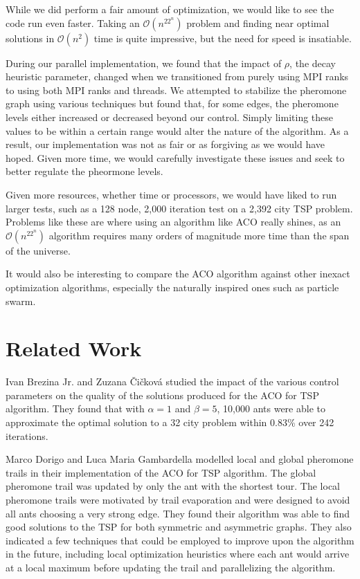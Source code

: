 \documentclass[twocolumn]{article}
\begin{document}
While we did perform a fair amount of optimization, we would like to see the
code run even faster. Taking an $\mathcal{O}(n^22^n)$ problem and finding 
near optimal solutions in $\mathcal{O}(n^2)$ time is quite impressive, but
the need for speed is insatiable.

During our parallel implementation, we found that the impact of $\rho$, the 
decay heuristic parameter, changed when we transitioned from purely using MPI
ranks to using both MPI ranks and threads. We attempted to stabilize the 
pheromone graph using various techniques but found that, for some edges, the
pheromone levels either increased or decreased beyond our control. Simply 
limiting these values to be within a certain range would alter the nature of the
algorithm. As a result, our implementation was not as fair or as forgiving as we
would have hoped. Given more time, we would carefully investigate these issues
and seek to better regulate the pheormone levels. 

Given more resources, whether time or processors, we would have liked to run 
larger tests, such as a 128 node, 2,000 iteration test on a 2,392 city TSP 
problem. Problems like these are where using an algorithm like ACO really
shines, as an $\mathcal{O}(n^22^n)$ algorithm requires many orders of 
magnitude more time than the span of the universe.

It would also be interesting to compare the ACO algorithm against other
inexact optimization algorithms, especially the naturally inspired ones
such as particle swarm. 

\section{Related Work}

Ivan Brezina Jr. and Zuzana \v{C}i\v{c}kov\'{a} \cite{mis:aco} studied the 
impact of the various control parameters on the quality of the solutions 
produced for the ACO for TSP algorithm. They found that with $\alpha=1$ and 
$\beta=5$, 10,000 ants were able to approximate the optimal solution to a 32 city
problem within 0.83\% over 242 iterations. 

Marco Dorigo and Luca Maria Gambardella \cite{iridia:aco} modelled local and 
global pheromone trails in their implementation of the ACO for TSP algorithm. 
The global pheromone trail was updated by only the ant with the shortest tour. 
The local pheromone trails were motivated by trail evaporation and were designed
to avoid all ants choosing a very strong edge. They found their algorithm was 
able to find good solutions to the TSP for both symmetric and asymmetric graphs.
They also indicated a few techniques that could be employed to improve upon the 
algorithm in the future, including local optimization heuristics where each ant 
would arrive at a local maximum before updating the trail and parallelizing the
algorithm. 
\end{document}
